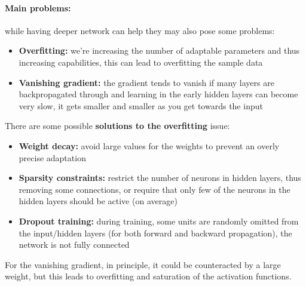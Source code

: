 \documentclass[11pt]{article}
\begin{document}
		\paragraph{Main problems:} while having deeper network can help they may also pose some problems:
		\begin{itemize}
			\item \textbf{Overfitting:} we're increasing the number of adaptable parameters and thus increasing capabilities, this can lead to overfitting the sample data
			\item \textbf{Vanishing gradient:} the gradient tends to vanish if many layers are backpropagated through and learning in the early hidden layers can become very slow, it gets smaller and smaller as you get towards the input
		\end{itemize}
		
		There are some possible \textbf{solutions to the overfitting} issue: 
		\begin{itemize}
			\item \textbf{Weight decay:} avoid large values for the weights to prevent an overly precise adaptation
			\item \textbf{Sparsity constraints:} restrict the number of neurons in hidden layers, thus removing some connections, or require that only few of the neurons in the hidden layers should be active (on average)
			\item \textbf{Dropout training:} during training, some units are randomly omitted from the input/hidden layers (for both forward and backward propagation), the network is not fully connected
		\end{itemize}
		
		For the vanishing gradient, in principle, it could be counteracted by a large weight, but this leads to overfitting and saturation of the activation functions.\\
		
		\newpage
		
\end{document}
